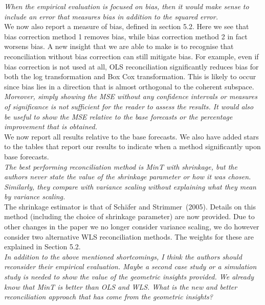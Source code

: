 \documentclass[a4paper,11pt]{article}
\begin{document}
\begin{enumerate}
		\textit{When the empirical evaluation is focused on bias, then it would make sense to include an error that measures bias in addition to the squared error.}\\
		
		We now also report a measure of bias, defined in section 5.2.  Here we see that bias correction method 1 removes bias, while bias correction method 2 in fact worsens bias.  A new insight that we are able to make is to recognise that reconciliation without bias correction can still mitigate bias.  For example, even if bias correction is not used at all, OLS reconciliation significantly reduces bias for both the log transformation and Box Cox transformation.  This is likely to occur since bias lies in a direction that is almost orthogonal to the coherent subspace.\\
		
		\textit{Moreover, simply showing the MSE without any confidence intervals or measures of significance is not sufficient for the reader to assess the results.  It would also be useful to show the MSE relative to the base forecasts or the percentage improvement that is obtained.} \\
		
		We now report all results relative to the base forecasts. We also have added stars to the tables that report our results to indicate when a method significantly upon base forecasts.\\
	
	    \textit{The best performing reconciliation method is MinT with shrinkage, but the authors never state	the value of the shrinkage parameter or how it was chosen.  Similarly, they compare with variance scaling without explaining what they mean by variance scaling.}\\
	
	    The shrinkage estimator is that of Sch\"afer and Strimmer~(2005). Details on this method (including the choice of shrinkage parameter) are now provided.  Due to other changes in the paper we no longer consider variance scaling, we do however consider two alternative WLS reconciliation methods.  The weights for these are explained in Section 5.2.\\
	
	    \textit{In addition to the above mentioned shortcomings, I think the authors should reconsider their empirical evaluation. Maybe a second case study or a simulation study is needed to show the value of the geometric insights provided. We already know that MinT is better than OLS and WLS. What is the new and better reconciliation approach that has come from the geometric insights?}\\	
		

\end{enumerate}
\end{document}
